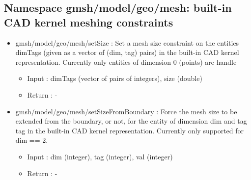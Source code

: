 \documentclass[dvipdfmx, 9pt, a4paper]{article}
\numberwithin{equation}{section}
\begin{document}
\subsection{Namespace gmsh/model/geo/mesh: built-in CAD kernel meshing constraints}
\begin{itemize}
\item gmsh/model/geo/mesh/setSize : Set a mesh size constraint on the entities dimTags (given as a vector of (dim, tag) pairs) in the built-in CAD kernel representation. Currently only entities of dimension 0 (points) are handle
\begin{itemize}
\item Input : dimTags (vector of pairs of integers), size (double)
\item Return : -
\end{itemize}
\item gmsh/model/geo/mesh/setSizeFromBoundary : Force the mesh size to be extended from the boundary, or not, for the entity of
dimension dim and tag tag in the built-in CAD kernel representation. Currently only supported for dim == 2.
\begin{itemize}
\item Input : dim (integer), tag (integer), val (integer)
\item Return : -
\end{itemize}
\end{itemize}
\end{document}
